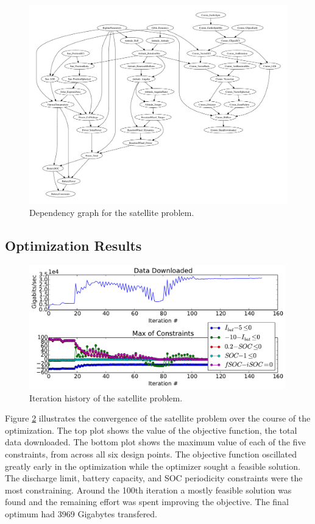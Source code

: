 \documentclass[]{aiaa-tc} %
\begin{document}
    \begin{figure}[!htb]\begin{center}
      \includegraphics[width=.95\textwidth]{images/CADRE.pdf}
      \caption{ Dependency graph for the satellite problem. \label{fig:cadre_graph}}
    \end{center}\end{figure}

    \subsection{Optimization Results}


        \begin{figure}[!htb]
        \centering
        \includegraphics[width=0.99\textwidth]{images/cadre_opt_progress}
        \caption[width=0.22\textwidth]{Iteration history of the satellite problem.
        \label{convergence}
        }
        \end{figure}


        Figure \ref{convergence} illustrates the convergence of the satellite problem over the course of
        the optimization. The top plot shows the value of the objective function, the total data downloaded. 
        The bottom plot shows the maximum value of each of the five constraints, from across all six design points.
        The objective function oscillated greatly early in the optimization while the optimizer sought a feasible 
        solution. The discharge limit, battery capacity, and SOC periodicity
        constraints were the most constraining. Around the 100th iteration a mostly feasible solution was found and 
        the remaining effort was spent improving the objective. The final optimum had 3969 Gigabytes transfered. 
\end{document}

